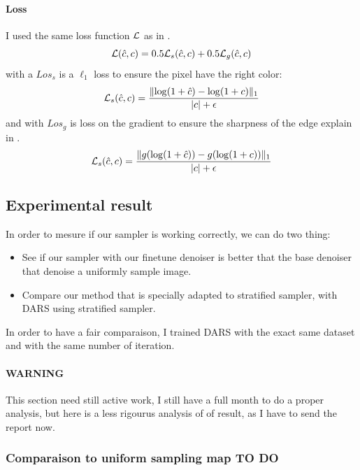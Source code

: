 \documentclass{classeENS}
\begin{document}
\paragraph*{Loss} I used the same loss function $\mathcal L$ as in \cite{kuznetsov2018deep}.
\begin{equation}
    \label{eq:6}
    \mathcal L(\hat c,c) = 0.5\mathcal L_s(\hat c,c) + 0.5\mathcal L_g(\hat c,c) 
\end{equation}
with a $Los_s$ is a $\ell_1$ loss to ensure the pixel have the right color:
\begin{equation}
    \label{eq:7}
    \mathcal L_s(\hat c,c) = \frac{\lVert \log(1+\hat c) - \log(1+c) \rVert_1}{|c| + \epsilon}
\end{equation}
and with $Los_g$ is loss on the gradient to ensure the sharpness of the edge explain in \cite{5617283}.
\begin{equation}
    \label{eq:8}
    \mathcal L_s(\hat c,c) = \frac{\lVert g(\log(1+\hat c)) - g(\log(1+c)) \rVert_1}{|c| + \epsilon}
\end{equation}

\subsection{Experimental result}

In order to mesure if our sampler is working correctly, we can do two thing:
\begin{itemize}
    \item See if our sampler with our finetune denoiser is better that the base denoiser 
    that denoise a uniformly sample image.
    \item Compare our method that is specially adapted to stratified sampler, with DARS using stratified
    sampler. 
\end{itemize}
In order to have a fair comparaison, I trained DARS with the exact same dataset and with the same 
number of iteration.


\paragraph*{WARNING} This section need still active work, 
I still have a full month to do a proper analysis, but
here is a less rigourus analysis of of result, as I have to send 
the report now.

\subsubsection{Comparaison to uniform sampling map {\color{red} TO DO}}
\end{document}
